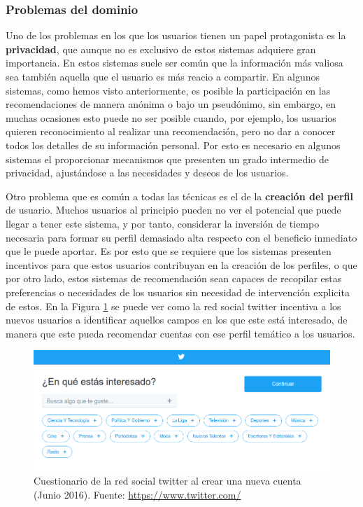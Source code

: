 \subsubsection{Problemas del dominio}
\label{sec:problemas}
Uno de los problemas en los que los usuarios tienen un papel protagonista es la \textbf{privacidad}, que aunque no es exclusivo de estos sistemas adquiere gran importancia. En estos sistemas suele ser común que la información más valiosa sea también aquella que el usuario es más reacio a compartir. En algunos sistemas, como hemos visto anteriormente, es posible la participación en las recomendaciones de manera anónima o bajo un pseudónimo\cite{Resnick:1994:GOA:192844.192905}, sin embargo, en muchas ocasiones esto puede no ser posible cuando, por ejemplo, los usuarios quieren reconocimiento al realizar una recomendación, pero no dar a conocer todos los detalles de su información personal. Por esto es necesario en algunos sistemas el proporcionar mecanismos que presenten un grado intermedio de privacidad, ajustándose a las necesidades y deseos de los usuarios. 

Otro problema que es común a todas las técnicas es el de la \textbf{creación del perfil} de usuario. Muchos usuarios al principio pueden no ver el potencial que puede llegar a tener este sistema, y por tanto, considerar la inversión de tiempo necesaria para formar su perfil demasiado alta respecto con el beneficio inmediato que le puede aportar. Es por esto que se requiere que los sistemas presenten incentivos para que estos usuarios contribuyan en la creación de los perfiles, o que por otro lado, estos sistemas de recomendación sean capaces de recopilar estas preferencias o necesidades de los usuarios sin necesidad de intervención explicita de estos. En la Figura \ref{fig:twitter-interest} se puede ver como la red social twitter incentiva a los nuevos usuarios a identificar aquellos campos en los que este está interesado, de manera que este pueda recomendar cuentas con ese perfil temático a los usuarios.

\begin{figure}[!h]
\begin{center}
\includegraphics[width=1\textwidth]{./figures/twitter-interest.png}
\caption[Cuestionario de la red social twitter]{Cuestionario de la red social twitter al crear una nueva cuenta (Junio 2016). Fuente: \href{https://www.twitter.com/}{https://www.twitter.com/}}
\label{fig:twitter-interest}
\end{center}
\end{figure}

